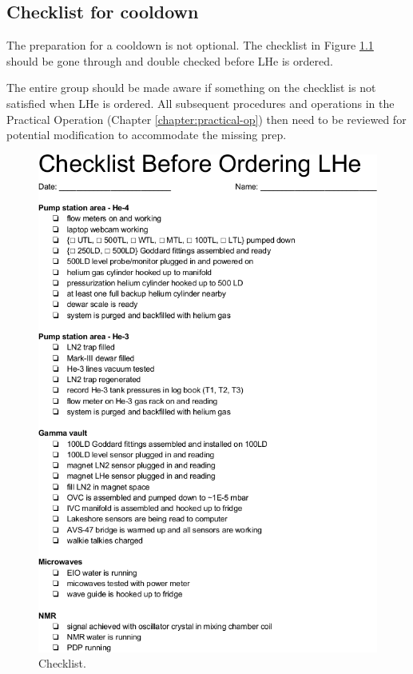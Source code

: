 \begin{appendices}
\noappendicestocpagenum
\addappheadtotoc
\chapter{Checklist for cooldown}
\label{appendix:checklist-for-cooldown}

The preparation for a cooldown is not optional.  The checklist in Figure \ref{fig:checklist} should be gone through and double checked before LHe is ordered.


The entire group should be made aware if something on the checklist is not satisfied when LHe is ordered.  All subsequent procedures and operations in the Practical Operation (Chapter \ref{chapter:practical-op}) then need to be reviewed for potential modification to accommodate the missing prep.

\begin{figure}[!htbp]
 \centering
 \includegraphics[height=.95\textheight]{./docs/cooldown-checklist.png}
 \caption{Checklist.}
 \label{fig:checklist}
\end{figure}




\end{appendices}
